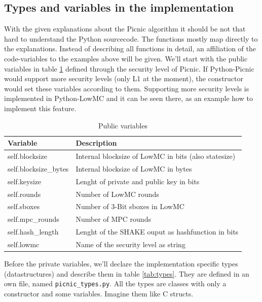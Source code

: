 \documentclass[]{article}
\begin{document}
\subsection{Types and variables in the implementation}
With the given explanations about the Picnic algorithm it should be not that hard to understand the Python sourcecode. The functions mostly map directly to the explanations. Instead of describing all functions in detail, an affiliation of the code-variables to the examples above will be given. We'll start with the public variables in table \ref{tab:secparams} defined through the security level of Picnic. If Python-Picnic would support more security levels (only L1 at the moment), the constructor would set these variables according to them. Supporting more security levels is implemented in Python-LowMC and it can be seen there, as an example how to implement this feature.\newpage
\begin{table}[htbp]
\begin{center}
\begin{tabular}{|l|l|}
\hline
\textbf{Variable}  & \textbf{Description} \\ \hline
self.blocksize  &  Internal blocksize of LowMC in bits (also statesize)\\ \hline
self.blocksize\_bytes  &  Internal blocksize of LowMC in bytes\\ \hline
self.keysize  &  Lenght of private and public key in bits\\ \hline
self.rounds  &  Number of LowMC rounds\\ \hline
self.sboxes  &  Number of 3-Bit sboxes in LowMC\\ \hline
self.mpc\_rounds  &  Number of MPC rounds\\ \hline
self.hash\_length  &  Lenght of the SHAKE ouput as hashfunction in bits\\ \hline
self.lowmc  &  Name of the security level as string\\ \hline
\end{tabular}
\caption{Public variables}
\label{tab:secparams}
\end{center}
\end{table}
\noindent Before the private variables, we'll declare the implementation specific types (datastructures) and describe them in table \ref{tab:types}. They are defined in an own file, named \texttt{picnic\_types.py}. All the types are classes with only a constructor and some variables. Imagine them like C structs.
\end{document}
